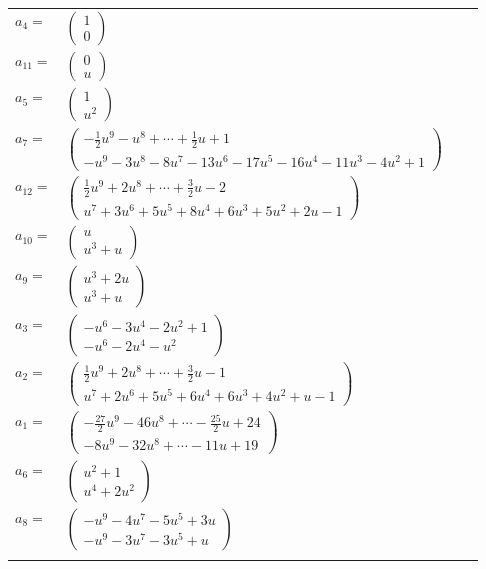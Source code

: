 \documentclass[1p]{elsarticle_modified}
\theoremstyle{definition}
\begin{document}
\begin{tabular}{m{7pt} m{180pt} m{7pt} m{180pt} }
\flushright $a_{4}=$&$\begin{pmatrix}1\\0\end{pmatrix}$ \\
\flushright $a_{11}=$&$\begin{pmatrix}0\\u\end{pmatrix}$ \\
\flushright $a_{5}=$&$\begin{pmatrix}1\\u^2\end{pmatrix}$ \\
\flushright $a_{7}=$&$\begin{pmatrix}-\frac{1}{2} u^9- u^8+\cdots+\frac{1}{2} u+1\\- u^9-3 u^8-8 u^7-13 u^6-17 u^5-16 u^4-11 u^3-4 u^2+1\end{pmatrix}$ \\
\flushright $a_{12}=$&$\begin{pmatrix}\frac{1}{2} u^9+2 u^8+\cdots+\frac{3}{2} u-2\\u^7+3 u^6+5 u^5+8 u^4+6 u^3+5 u^2+2 u-1\end{pmatrix}$ \\
\flushright $a_{10}=$&$\begin{pmatrix}u\\u^3+u\end{pmatrix}$ \\
\flushright $a_{9}=$&$\begin{pmatrix}u^3+2 u\\u^3+u\end{pmatrix}$ \\
\flushright $a_{3}=$&$\begin{pmatrix}- u^6-3 u^4-2 u^2+1\\- u^6-2 u^4- u^2\end{pmatrix}$ \\
\flushright $a_{2}=$&$\begin{pmatrix}\frac{1}{2} u^9+2 u^8+\cdots+\frac{3}{2} u-1\\u^7+2 u^6+5 u^5+6 u^4+6 u^3+4 u^2+u-1\end{pmatrix}$ \\
\flushright $a_{1}=$&$\begin{pmatrix}-\frac{27}{2} u^9-46 u^8+\cdots-\frac{25}{2} u+24\\-8 u^9-32 u^8+\cdots-11 u+19\end{pmatrix}$ \\
\flushright $a_{6}=$&$\begin{pmatrix}u^2+1\\u^4+2 u^2\end{pmatrix}$ \\
\flushright $a_{8}=$&$\begin{pmatrix}- u^9-4 u^7-5 u^5+3 u\\- u^9-3 u^7-3 u^5+u\end{pmatrix}$\\&\end{tabular}
\end{document}
